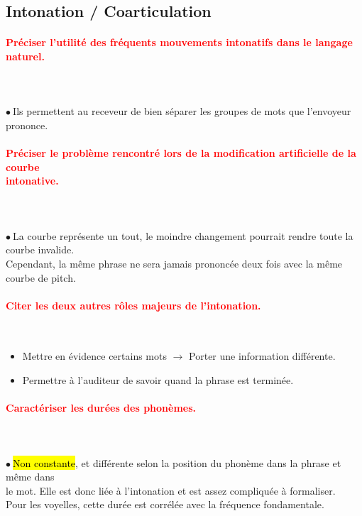 \documentclass[letterpaper, 12pt]{article}
\newcommand{\alinea}{
\hspace*{0.3cm}}
\newcommand{\red}[1]{
	\textcolor{red}{#1}
}
\newcommand{\point}{$\bullet\ $}
\begin{document}
	\subsection{Intonation / Coarticulation}
		\paragraph{\red{Préciser l'utilité des fréquents mouvements intonatifs dans le langage naturel.}}~\\~\\
    		\point Ils permettent au receveur de bien séparer les groupes de mots que l'envoyeur prononce.
    	\paragraph{\red{Préciser le problème rencontré lors de la modification artificielle de la courbe 
    	~\\ \hspace*{0.035cm} intonative.}}~\\~\\
			\point La courbe représente un tout, le moindre changement pourrait rendre toute la courbe invalide.
				\\\alinea Cependant, la même phrase ne sera jamais prononcée deux fois avec la même courbe de pitch.
		\paragraph{\red{Citer les deux autres rôles majeurs de l'intonation.}}~\\
			\vspace*{-0.5cm}
			\begin{itemize}
				\setlength{\itemsep}{0pt}		
				\setlength{\parskip}{0pt}		
				\setlength{\parsep}{0pt}	
				\item Mettre en évidence certains mots $\rightarrow$ Porter une information différente.
				\item Permettre à l'auditeur de savoir quand la phrase est terminée.
			\end{itemize}		
		\paragraph{\red{Caractériser les durées des phonèmes.}}~\\~\\
			\point \hl{Non constante}, et différente selon la position du phonème dans la phrase et même dans
				\\\alinea le mot. Elle est donc liée à l'intonation et est assez compliquée à formaliser.
				\\\alinea Pour les voyelles, cette durée est corrélée avec la fréquence fondamentale.
\end{document}
